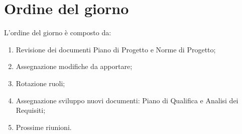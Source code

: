 \section{Ordine del giorno}
L'ordine del giorno è composto da: 
\begin{enumerate}
	\item Revisione dei documenti Piano di Progetto e Norme di Progetto; 
	\item Assegnazione modifiche da apportare; 
	\item Rotazione ruoli;
	\item Assegnazione sviluppo nuovi documenti: Piano di Qualifica e Analisi dei Requisiti;
	\item Prossime riunioni.
\end{enumerate}
